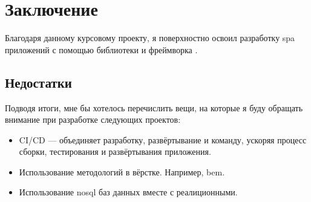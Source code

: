 \section{Заключение}
Благодаря данному курсовому проекту, я поверхностно освоил разработку \acrshort{spa} приложений с помощью библиотеки \textcite{react} и фреймворка \textcite{express}.

\subsection{Недостатки}
Подводя итоги, мне бы хотелось перечислить вещи, на которые я буду обращать внимание при разработке следующих проектов:
\begin{itemize}
    \item CI/CD --- объединяет разработку, развёртывание и команду, ускоряя процесс сборки, тестирования и развёртывания приложения.
    \item Использование методологий в вёрстке. Например, \acrfull{bem}.
    \item Использование \acrshort{nosql} баз данных вместе с реалиционными.
\end{itemize}

\clearpage
